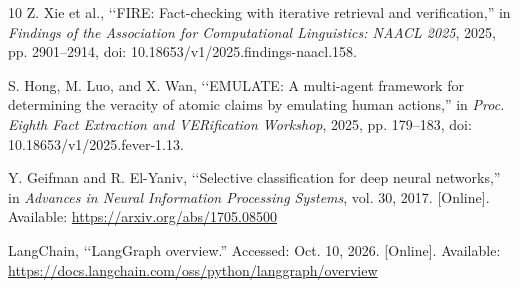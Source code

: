 \documentclass[conference]{IEEEtran}
\begin{document}
\begin{thebibliography}{10}
Z. Xie et al., \lq\lq FIRE: Fact-checking with iterative retrieval and verification,'' in \emph{Findings of the Association for Computational Linguistics: NAACL 2025}, 2025, pp. 2901--2914, doi: 10.18653/v1/2025.findings-naacl.158.

S. Hong, M. Luo, and X. Wan, \lq\lq EMULATE: A multi-agent framework for determining the veracity of atomic claims by emulating human actions,'' in \emph{Proc. Eighth Fact Extraction and VERification Workshop}, 2025, pp. 179--183, doi: 10.18653/v1/2025.fever-1.13.

Y. Geifman and R. El-Yaniv, \lq\lq Selective classification for deep neural networks,'' in \emph{Advances in Neural Information Processing Systems}, vol. 30, 2017. [Online]. Available: \url{https://arxiv.org/abs/1705.08500}

LangChain, \lq\lq LangGraph overview.'' Accessed: Oct. 10, 2026. [Online]. Available: \url{https://docs.langchain.com/oss/python/langgraph/overview}
\end{thebibliography}
\end{document}
